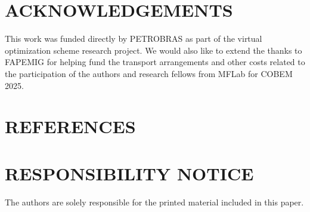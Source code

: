\documentclass[10pt,fleqn,a4paper,twoside]{article}
\begin{document}
\section{ACKNOWLEDGEMENTS}

This work was funded directly by PETROBRAS as part of the virtual optimization scheme research project. We would also like to extend the thanks to FAPEMIG for helping fund the transport arrangements and 
other costs related to the participation of the authors and research fellows from MFLab for COBEM 2025.

\section{REFERENCES} 
\label{Sec:references}


\renewcommand{\refname}{}


\section{RESPONSIBILITY NOTICE}
The authors are solely responsible for the printed material included in this paper.
\end{document}

